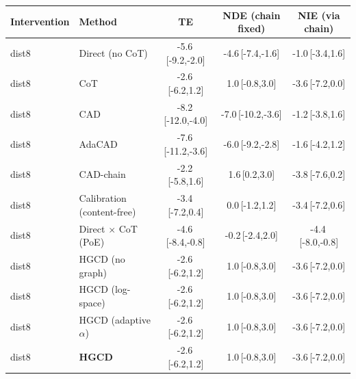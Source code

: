 \begin{tabular}{llccc}
\toprule
Intervention & Method & TE & NDE (chain fixed) & NIE (via chain) \\
\midrule
dist8 & Direct (no CoT) & -5.6\,{\scriptsize[-9.2,-2.0]} & -4.6\,{\scriptsize[-7.4,-1.6]} & -1.0\,{\scriptsize[-3.4,1.6]} \\
dist8 & CoT & -2.6\,{\scriptsize[-6.2,1.2]} & 1.0\,{\scriptsize[-0.8,3.0]} & -3.6\,{\scriptsize[-7.2,0.0]} \\
dist8 & CAD & -8.2\,{\scriptsize[-12.0,-4.0]} & -7.0\,{\scriptsize[-10.2,-3.6]} & -1.2\,{\scriptsize[-3.8,1.6]} \\
dist8 & AdaCAD & -7.6\,{\scriptsize[-11.2,-3.6]} & -6.0\,{\scriptsize[-9.2,-2.8]} & -1.6\,{\scriptsize[-4.2,1.2]} \\
dist8 & CAD-chain & -2.2\,{\scriptsize[-5.8,1.6]} & 1.6\,{\scriptsize[0.2,3.0]} & -3.8\,{\scriptsize[-7.6,0.2]} \\
dist8 & Calibration (content-free) & -3.4\,{\scriptsize[-7.2,0.4]} & 0.0\,{\scriptsize[-1.2,1.2]} & -3.4\,{\scriptsize[-7.2,0.6]} \\
dist8 & Direct $\times$ CoT (PoE) & -4.6\,{\scriptsize[-8.4,-0.8]} & -0.2\,{\scriptsize[-2.4,2.0]} & -4.4\,{\scriptsize[-8.0,-0.8]} \\
dist8 & HGCD (no graph) & -2.6\,{\scriptsize[-6.2,1.2]} & 1.0\,{\scriptsize[-0.8,3.0]} & -3.6\,{\scriptsize[-7.2,0.0]} \\
dist8 & HGCD (log-space) & -2.6\,{\scriptsize[-6.2,1.2]} & 1.0\,{\scriptsize[-0.8,3.0]} & -3.6\,{\scriptsize[-7.2,0.0]} \\
dist8 & HGCD (adaptive $\alpha$) & -2.6\,{\scriptsize[-6.2,1.2]} & 1.0\,{\scriptsize[-0.8,3.0]} & -3.6\,{\scriptsize[-7.2,0.0]} \\
dist8 & \textbf{HGCD} & -2.6\,{\scriptsize[-6.2,1.2]} & 1.0\,{\scriptsize[-0.8,3.0]} & -3.6\,{\scriptsize[-7.2,0.0]} \\
\bottomrule
\end{tabular}
